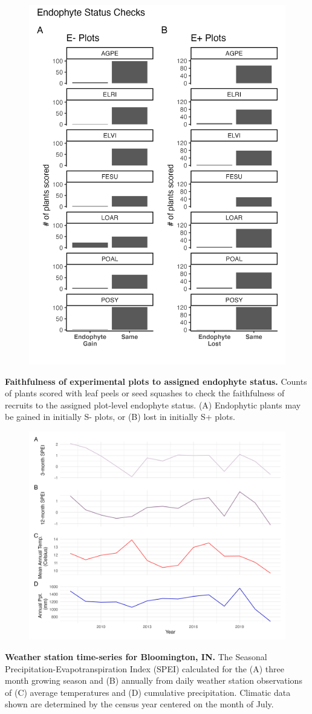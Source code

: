 \documentclass[12pt]{article}
\begin{document}
\begin{figure}
	\centering
	\includegraphics[width=.6\linewidth]{endo_check_plot.png}
\end{figure}
 \textbf{Faithfulness of experimental plots to assigned endophyte status.} Counts of plants scored with leaf peels or seed squashes to check the faithfulness of recruits to the assigned plot-level endophyte status. (A) Endophytic plants may be gained in initially S- plots, or (B) lost in initially S+ plots.
\newpage

\begin{figure}
	\centering
	\includegraphics[width=\linewidth]{climate_plot.png}
\end{figure}
 \textbf{Weather station time-series for Bloomington, IN.} The Seasonal Precipitation-Evapotranspiration Index (SPEI) calculated for the (A) three month growing season and (B) annually from daily weather station observations of (C) average temperatures and (D) cumulative precipitation. Climatic data shown are determined by the census year centered on the month of July. %
\newpage
\end{document}
